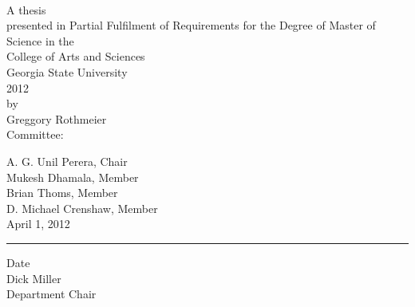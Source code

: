 \begin{doublespace}
\begin{center}
  \textsc{\thesisTitle}\\
  \vspace{0.4in}
  A thesis\\
  presented in Partial Fulfilment of Requirements for the Degree of Master of Science in the\\
  College of Arts and Sciences\\
  Georgia State University\\
  2012\\
  by\\
  Greggory Rothmeier\\
  \vspace*{\fill}
  Committee:\\
  \begin{singlespace}
    \signhere
    A. G. Unil Perera, Chair\\
    \signhere
    Mukesh Dhamala, Member\\
    \signhere
    Brian Thoms, Member\\
    \signhere
    D. Michael Crenshaw, Member \\
    \vspace{0.2in}
    April 1, 2012\\
    \rule{\linewidth}{0.5mm}
    Date\\
    \signhere
    Dick Miller\\
    Department Chair\\
    \vspace{0.1in}
  \end{singlespace}
\end{center}
\end{doublespace}